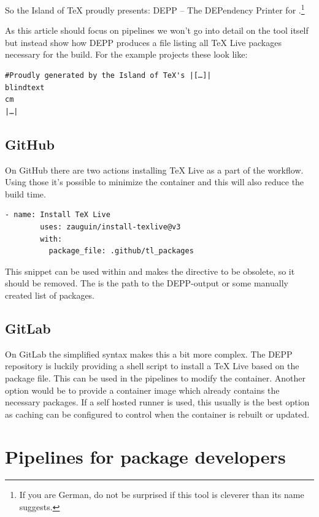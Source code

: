 \documentclass[final]{ltugboat}
\newcommand*{\TeXLive}{\acro{\TeX\,Live}}
\newcommand*{\directive}[1]{\textbf{\detokenize{#1}}}
\begin{document}
So the Island of TeX proudly presents: DEPP – The DEPendency Printer for \TeXLive\cite{depp}.\footnote{If you are German, do not be surprised if this tool is cleverer than its name suggests.}

As this article should focus on pipelines we won't go into detail on the tool itself but instead show how DEPP produces a file listing all TeX Live packages necessary for the build.
For the example projects these look like:

\begin{verbatim}
#Proudly generated by the Island of TeX's |[…]|
blindtext
cm
|…|
\end{verbatim}

\subsection{GitHub}

On GitHub there are two actions installing TeX Live as a part of the workflow.
Using those it's possible to minimize the container and this will also reduce the build time.

\begin{verbatim}
- name: Install TeX Live
        uses: zauguin/install-texlive@v3
        with:
          package_file: .github/tl_packages
\end{verbatim}

This snippet can be used within \directive{steps:} and makes the \directive{container:} directive to be obsolete, so it should be removed.
The \directive{package_file:} is the path to the DEPP-output or some manually created list of packages.

 \subsection{GitLab}

 On GitLab the simplified syntax makes this a bit more complex.
 The DEPP repository is luckily providing a shell script to install a TeX Live based on the package file.
 This can be used in the pipelines to modify the container.
 Another option would be to provide a container image which already contains the necessary packages.
 If a self hosted runner is used, this usually is the best option as caching can be configured to control when the container is rebuilt or updated.

\section{Pipelines for package developers}
\end{document}
